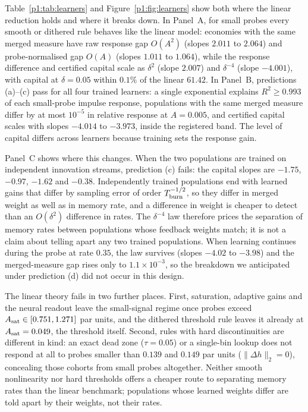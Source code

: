 Table~\ref{p1:tab:learners} and Figure~\ref{p1:fig:learners} show both where the linear reduction holds and where it breaks down. In Panel~A, for small probes every smooth or dithered rule behaves like the linear model: economies with the same merged measure have raw response gap $O(A^2)$ (slopes $2.011$ to $2.064$) and probe-normalised gap $O(A)$ (slopes $1.011$ to $1.064$), while the response difference and certified capital scale as $\delta^2$ (slope $2.007$) and $\delta^{-4}$ (slope $-4.001$), with capital at $\delta=0.05$ within $0.1\%$ of the linear $61.42$. In Panel~B, predictions (a)--(c) pass for all four trained learners: a single exponential explains $R^2\ge0.993$ of each small-probe impulse response, populations with the same merged measure differ by at most $10^{-5}$ in relative response at $A=0.005$, and certified capital scales with slopes $-4.014$ to $-3.973$, inside the registered band. The level of capital differs across learners because training sets the response gain.

Panel~C shows where this changes. When the two populations are trained on independent innovation streams, prediction (c) fails: the capital slopes are $-1.75$, $-0.97$, $-1.62$ and $-0.38$. Independently trained populations end with learned gains that differ by sampling error of order $T_{\rm burn}^{-1/2}$, so they differ in merged weight as well as in memory rate, and a difference in weight is cheaper to detect than an $O(\delta^2)$ difference in rates. The $\delta^{-4}$ law therefore prices the separation of memory rates between populations whose feedback weights match; it is not a claim about telling apart any two trained populations. When learning continues during the probe at rate $0.35$, the law survives (slopes $-4.02$ to $-3.98$) and the merged-measure gap rises only to $1.1\times10^{-3}$, so the breakdown we anticipated under prediction (d) did not occur in this design.

The linear theory fails in two further places. First, saturation, adaptive gains and the neural readout leave the small-signal regime once probes exceed $A_{\rm sat}\in[0.751,1.271]$ par units, and the dithered threshold rule leaves it already at $A_{\rm sat}=0.049$, the threshold itself. Second, rules with hard discontinuities are different in kind: an exact dead zone ($\tau=0.05$) or a single-bin lookup does not respond at all to probes smaller than $0.139$ and $0.149$ par units ($\|\Delta h\|_2=0$), concealing those cohorts from small probes altogether. Neither smooth nonlinearity nor hard thresholds offers a cheaper route to separating memory rates than the linear benchmark; populations whose learned weights differ are told apart by their weights, not their rates.

